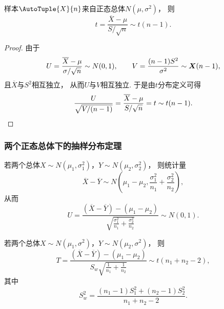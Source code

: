 \begin{theorem}
样本\(\AutoTuple{X}{n}\)来自正态总体\(N(\mu,\sigma^2)\)，
则\begin{equation}\label{equation:抽样分布定理.一个正态总体的抽样分布4}
	t = \frac{\overline{X}-\mu}{S / \sqrt{n}} \sim t(n-1).
\end{equation}
\begin{proof}
由于\[
	U = \frac{\overline{X}-\mu}{\sigma/\sqrt{n}} \sim N(0,1),
	\qquad
	V = \frac{(n-1)S^2}{\sigma^2} \sim \boldsymbol{X}(n-1),
\]
且\(\overline{X}\)与\(S^2\)相互独立，
从而\(U\)与\(V\)相互独立.
于是由\(t\)分布定义可得\[
	\frac{U}{\sqrt{V/(n-1)}}
	= \frac{\overline{X}-\mu}{S/\sqrt{n}}
	= t \sim t(n-1).
	\qedhere
\]
\end{proof}
\end{theorem}

\subsubsection{两个正态总体下的抽样分布定理}
\begin{theorem}
若两个总体\(X \sim N(\mu_1,\sigma_1^2)\)，\(Y \sim N(\mu_2,\sigma_2^2)\)，
则统计量\begin{equation}
	\overline{X}-\overline{Y}
	\sim
	N\left(\mu_1-\mu_2,\frac{\sigma_1^2}{n_1}+\frac{\sigma_2^2}{n_2}\right),
\end{equation}
从而\begin{equation}
	U = \frac{
		(\overline{X}-\overline{Y})-(\mu_1-\mu_2)
	}{
		\sqrt{\frac{\sigma_1^2}{n_1}+\frac{\sigma_2^2}{n_2}}
	}
	\sim
	N(0,1).
\end{equation}
\end{theorem}

\begin{theorem}
若两个总体\(X \sim N(\mu_1,\sigma^2)\)，\(Y \sim N(\mu_2,\sigma^2)\)，
则\begin{equation}
	T = \frac{
			(\overline{X}-\overline{Y})-(\mu_1-\mu_2)
		}{
			S_w \sqrt{\frac{1}{n_1}+\frac{1}{n_2}}
		}
	\sim
	t(n_1+n_2-2),
\end{equation}
其中\[
	S_w^2 = \frac{(n_1-1)S_1^2+(n_2-1)S_2^2}{n_1+n_2-2}.
\]
\end{theorem}

